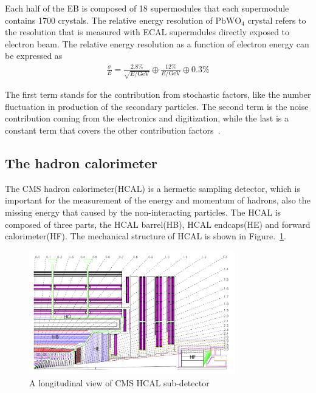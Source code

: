 Each half of the EB is composed of 18 supermodules that each supermodule contains 1700 crystals. The relative energy resolution of $\textrm{PbWO}_{4}$ crystal  refers to the resolution that is measured with ECAL supermdules directly exposed to electron beam. The relative energy resolution as a function of electron energy can be expressed as 
\begin{align*}
\frac{\sigma}{E}=\frac{2.8\%}{\sqrt{E/\textrm{GeV}}}\oplus\frac{12\%}{E/\textrm{GeV}}\oplus 0.3\%
\end{align*}

The first term stands for the contribution from stochastic factors, like the number fluctuation in production of the secondary particles. The second term is the noise contribution coming from the electronics and digitization, while the last is a constant term that covers the other contribution factors~\cite{ECAL_EB_reso}.

\subsection{The hadron calorimeter}

The CMS hadron calorimeter(HCAL) is a hermetic sampling detector, which is important for the measurement of the energy and momentum of hadrons, also the missing energy that caused by the non-interacting particles.  The HCAL is composed of three parts, the HCAL barrel(HB), HCAL endcaps(HE) and forward calorimeter(HF). The mechanical structure of HCAL is shown in Figure.~\ref{fig:HCALL_sketch}. 

\begin{figure}[htbp] 
\centering
\includegraphics[width=0.8\textwidth]{chapter3/HCAL_sketch.png}
\caption[A longitudinal view of CMS HCAL sub-detector]{A longitudinal view of CMS HCAL sub-detector~\cite{CMS_experiment}}
\label{fig:HCALL_sketch}
\end{figure}


